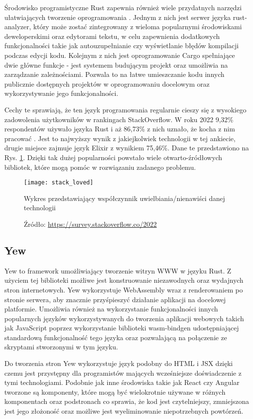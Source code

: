Środowisko programistyczne Rust zapewnia również wiele przydatnych narzędzi
ułatwiających tworzenie oprogramowania \cite{klabnik:rust}.
Jednym z nich jest serwer języka rust-analyzer, który może zostać zintegrowany
z wieloma popularnymi środowiskami deweloperskimi oraz edytorami tekstu,
w celu zapewnienia dodatkowych funkcjonalności takie jak
autouzupełnianie czy wyświetlanie błędów kompilacji podczas edycji kodu.
Kolejnym z nich jest oprogramowanie Cargo spełniające dwie główne funkcje - 
jest systemem budującym projekt oraz umożliwia na zarządzanie zależnościami.
Pozwala to na łatwe umieszczanie kodu innych publicznie dostępnych projektów
w oprogramowaniu docelowym oraz wykorzystywanie jego funkcjonalności.

Cechy te sprawiają, że ten język programowania regularnie cieszy się z
wysokiego zadowolenia użytkowników w rankingach StackOverflow.
W roku 2022 9,32\% respondentów używało języka Rust i aż 86,73\% z nich
uznało, że kocha z nim pracować \cite{stackoverflow:popularity}.
Jest to najwyższy wynik z jakiejkolwiek technologii w tej ankiecie,
drugie miejsce zajmuje język Elixir z wynikiem 75,46\%. 
Dane te przedstawiono na Rys. \ref{stack:loved}.
Dzięki tak dużej popularności powstało wiele otwarto-źródłowych bibliotek,
które mogą pomóc w rozwiązaniu zadanego problemu.
\begin{figure}[!htb]
  \centering
  \texttt{[image: stack\_loved]}
  \caption{Wykres przedstawiający współczynnik uwielbiania/nienawiści danej technologii}
  \label{stack:loved}
  \caption*{Źródło: \url{https://survey.stackoverflow.co/2022}}
\end{figure}
\FloatBarrier

\subsection*{Yew}
Yew to framework umożliwiający tworzenie witryn WWW w języku Rust.
Z użyciem tej biblioteki możliwe jest konstruowanie niezawodnych
oraz wydajnych stron internetowych. Yew wykorzystuje WebAssembly wraz
z renderowaniem po stronie serwera, aby znacznie przyśpieszyć działanie
aplikacji na docelowej platformie. Umożliwia również na wykorzystanie 
funkcjonalności innych popularnych języków wykorzystywanych do tworzenia
aplikacji webowych takich jak JavaScript poprzez wykorzystanie biblioteki
wasm-bindgen udostępniającej standardową funkcjonalność tego języka oraz
pozwalającą na połączenie ze skryptami stworzonymi w tym języku.

Do tworzenia stron Yew wykorzystuje język podobny do HTML i JSX dzięki
czemu jest przystępny dla programistów mających wcześniejsze doświadczenie
z tymi technologiami. Podobnie jak inne środowiska takie jak React czy Angular
tworzone są komponenty, które mogą być wielokrotnie używane w różnych komponentach
oraz podstronach co sprawia, że kod jest czytelniejszy, zmniejszona jest jego złożoność
oraz możliwe jest wyeliminowanie niepotrzebnych powtórzeń.

